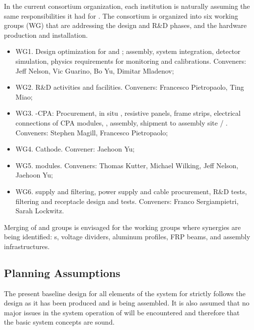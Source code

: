 In the current  consortium organization, each institution is naturally assuming the same responsibilities %
it had for . The consortium is organized into six working groups (WG) that are addressing the design and  R\&D phases, and the hardware production and installation.

\begin{itemize}
\item WG1. Design optimization for \single and \dual; assembly, system integration, detector simulation, physics requirements for monitoring and calibrations. Conveners: Jeff Nelson, Vic Guarino, Bo Yu, Dimitar Mladenov;
\item WG2. R\&D activities and facilities. Conveners: Francesco Pietropaolo, Ting Miao;
\item WG3. \single{}-CPA: Procurement, in situ , resistive panels, frame strips, electrical connections of CPA modules, , assembly, shipment to assembly site / . Conveners: Stephen Magill, Francesco Pietropaolo;
\item WG4. \dual Cathode. Convener: Jaehoon Yu;
\item WG5.  modules. Conveners: Thomas Kutter, Michael Wilking, Jeff Nelson, Jaehoon Yu;
\item WG6.  supply and filtering,  power supply and cable procurement, R\&D tests, filtering and receptacle design and tests. Conveners: Franco Sergiampietri, Sarah Lockwitz.
\end{itemize}

\noindent Merging of \single and \dual groups is envisaged for the working groups where synergies are being identified:  \fdth{}s, voltage dividers, aluminum profiles, FRP beams, and assembly infrastructures.

\subsection{Planning Assumptions}
\label{sec:fddp-hv-org-assmp}

The present baseline design for all elements of the  system for  strictly follows the  design as it has been produced and is being assembled.  It is also assumed that no major issues in the  system operation of  will be encountered and therefore that the basic  system concepts are sound.


